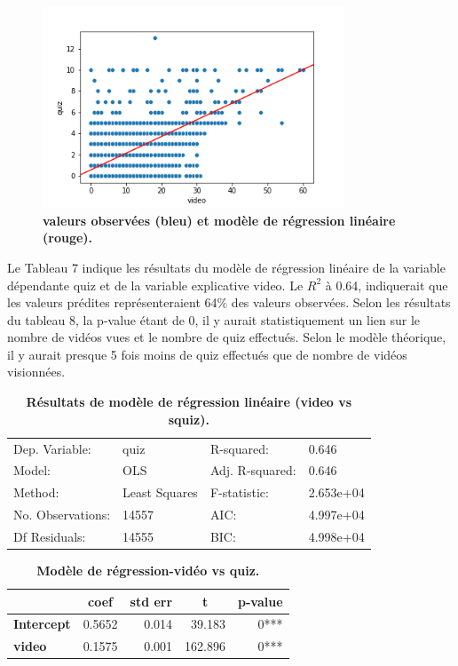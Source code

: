 \documentclass[12pt, a4paper, titlepage, table]{article}
\begin{document}
\begin{figure}[H]
	\centering
	\includegraphics[width=0.8\textwidth]{../../graph/scatter2_regression.png}
	\caption{\textbf{valeurs observées (bleu) et modèle de régression linéaire (rouge).}}
\end{figure}

Le Tableau 7 indique les résultats du modèle de régression linéaire de la variable dépendante quiz et de la variable explicative video. Le $R^2$ à 0.64, indiquerait que les valeurs prédites représenteraient 64\% des valeurs observées. 
Selon les résultats du tableau 8, la p-value étant de 0, il y aurait statistiquement un lien sur le nombre de vidéos vues et le nombre de quiz effectués. Selon le modèle théorique, il y aurait presque 5 fois moins de quiz effectués que de nombre de vidéos visionnées.

\begin{table}[H]
	\centering
	\fontsize{12}{20}\selectfont
	\begin{tabular}{|ll|ll|}
		\hline
			Dep. Variable:&	quiz&	R-squared:&	0.646\\
			Model:&	OLS&	Adj. R-squared:&	0.646\\
			Method:&	Least Squares&	F-statistic:&	2.653e+04\\
			No. Observations:&	14557&	AIC:&	4.997e+04\\
			Df Residuals:&	14555&	BIC:&	4.998e+04\\
		\hline
	\end{tabular}
\caption{\textbf{Résultats de modèle de régression linéaire (video vs squiz).}}
\end{table}
	
	
\begin{table}[H]
	\centering
	\fontsize{12}{20}\selectfont
	\begin{tabular}{|l|r|r|r|r|}
		\hline
			\multicolumn{1}{|c|}{\textbf{}}&
			\multicolumn{1}{c|}{\textbf{coef}}&
			\multicolumn{1}{c|}{\textbf{std err}}&
			\multicolumn{1}{c|}{\textbf{t}}&
			\multicolumn{1}{c|}{\textbf{p-value}}\\	
		\hline
		\textbf{Intercept}&	0.5652&	0.014&	39.183&	0***\\
		\textbf{video}&	0.1575&	0.001&	162.896&	0***\\
		\hline
\end{tabular}
\caption{\textbf{Modèle de régression-vidéo vs quiz.}}
\end{table}
\end{document}
